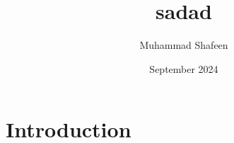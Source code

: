 \documentclass{article}
\title{sadad}
\author{Muhammad Shafeen}
\date{September 2024}
\begin{document}
\maketitle

\section{Introduction}
\end{document}
